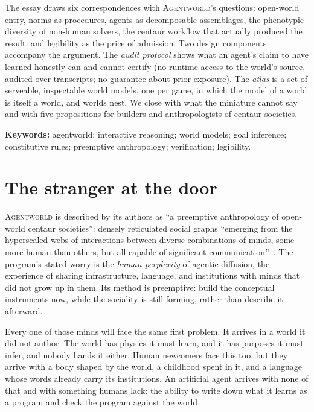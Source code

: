 \documentclass[11pt]{article}
\newcommand{\agentworld}{\textsc{Agentworld}}
\begin{document}
\begin{tcolorbox}[breakable, enhanced, colback=white, colframe=black!12,
  arc=3pt, boxrule=0.5pt, left=18pt, right=16pt, top=5pt, bottom=5pt,
  borderline west={3pt}{0pt}{cardblue}, drop fuzzy shadow=black!18]
The essay draws six correspondences with \agentworld{}'s questions: open-world entry, norms as
procedures, agents as decomposable assemblages, the phenotypic diversity of non-human solvers, the
centaur workflow that actually produced the result, and legibility as the price of admission. Two
design components accompany the argument. The \emph{audit protocol} shows what an agent's claim to have
learned honestly can and cannot certify (no runtime access to the world's source, audited over
\ArcAuditTranscripts{} transcripts; no guarantee about prior exposure). The \emph{atlas} is a set of
serveable, inspectable world models, one per game, in which the model of a world is itself a world, and
worlds nest. We close with what the miniature cannot say and with five propositions for builders and
anthropologists of centaur societies.
\end{tcolorbox}

\vspace{0.4em}
\noindent\textbf{Keywords:} agentworld; interactive reasoning; world models; goal inference;
constitutive rules; preemptive anthropology; verification; legibility.

\section{The stranger at the door}
\label{sec:stranger}

\agentworld{} is described by its authors as ``a preemptive anthropology of open-world centaur
societies'': densely reticulated social graphs ``emerging from the hyperscaled webs of interactions between
diverse combinations of minds, some more human than others, but all capable of significant
communication''~\cite{agentworld_cfp}. The program's stated worry is the \emph{human perplexity} of
agentic diffusion, the experience of sharing infrastructure, language, and institutions with minds that did
not grow up in them. Its method is preemptive: build the conceptual instruments now, while the sociality
is still forming, rather than describe it afterward.

Every one of those minds will face the same first problem. It arrives in a world it did not author. The
world has physics it must learn, and it has purposes it must infer, and nobody hands it either. Human
newcomers face this too, but they arrive with a body shaped by the world, a childhood spent in it, and a
language whose words already carry its institutions. An artificial agent arrives with none of that and
with something humans lack: the ability to write down what it learns as a program and check the program
against the world.
\end{document}
